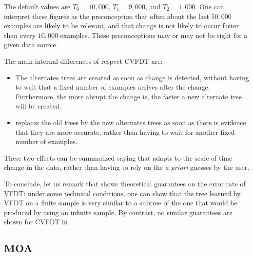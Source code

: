 The default values are %
$T_0=10,000$, $T_1=9,000$, and $T_2=1,000$.
One can interpret these figures as the preconception that often about the last $50,000$ examples 
are likely to be relevant, and that change is not likely to occur faster than every $10,000$ examples.
These preconceptions may or may not be right for a given data source. 


The main internal differences of \HWTAdwin respect CVFDT are: %
\begin{itemize}

\item  The alternates trees are created as soon as change is detected, without having 
to wait that a fixed number of examples arrives after the change. Furthermore,  
the more abrupt the change is, the faster a new alternate tree will be created. 

\item \HWTAdwin replaces the old trees by the new alternates trees as soon as  
there is evidence that they are more accurate, rather than having to wait
for another fixed number of examples. 
\end{itemize}

\noindent
These two effects can be summarized saying that \HWTAdwin %
adapts to the scale of time change in the data, rather than
having to rely on the {\em a priori} guesses by the user. 


\BEGINOMIT

To conclude, let us remark that \cite{vfdt} shows theoretical guarantees on the error 
rate of VFDT: under some technical conditions, one can show that 
the tree learned by VFDT on a finite sample is very similar to a subtree
of the one that would be produced by using an infinite sample. 
By contrast, no similar guarantees are shown for CVFDT in \cite{hulten-mining}.

\subsection{MOA}

